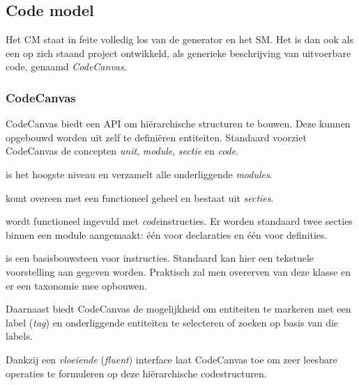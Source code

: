 
\subsection{Code model}
\label{subsection:devel-code-model}

Het CM staat in feite volledig los van de generator en het SM. Het is dan ook
als een op zich staand project ontwikkeld, als generieke beschrijving van
uitvoerbare code, genaamd \emph{CodeCanvas}.

\subsubsection{CodeCanvas}

CodeCanvas biedt een API om hi\"erarchische structuren te bouwen. Deze kunnen
opgebouwd worden uit zelf te defini\"eren entiteiten. Standaard voorziet
CodeCanvas de concepten \emph{unit}, \emph{module}, \emph{sectie} en
\emph{code}.

\begin{description}[noitemsep, topsep=1pt, partopsep=1pt]

  \item[Unit] is het hoogste niveau en verzamelt alle onderliggende
  \emph{modules}.
  
  \item[Module] komt overeen met een functioneel geheel en bestaat uit
  \emph{secties}.
  
  \item[Sectie] wordt functioneel ingevuld met \emph{code}instructies. Er
  worden standaard twee secties binnen een module aangemaakt: \'e\'en voor
  declaraties en \'e\'en voor definities.
  
  \item[Code] is een basisbouwsteen voor instructies. Standaard kan hier een
  tekstuele voorstelling aan gegeven worden. Praktisch zal men overerven van
  deze klasse en er een taxonomie mee opbouwen.

\end{description}

\noindent Daarnaast biedt CodeCanvas de mogelijkheid om entiteiten te markeren
met een label (\emph{tag}) en onderliggende entiteiten te selecteren of zoeken
op basis van die labels.

Dankzij een \emph{vloeiende} (\emph{fluent}) interface laat CodeCanvas
toe om zeer leesbare operaties te formuleren op deze hi\"erarchische
codestructuren.

